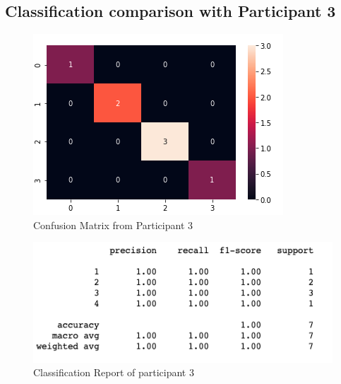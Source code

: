 \pagebreak
\subsection*{Classification comparison with Participant 3 }

\begin{figure}[!htp]
    \includegraphics[width=\textwidth]{Images/p3.png}
    \caption{Confusion Matrix from Participant 3}
    \label{fig:f11}
\end{figure}

\begin{figure}[!htp]
    \includegraphics[width=\textwidth]{Images/p3r.png}
    \caption{Classification Report of participant 3}
    \label{fig:f11}
\end{figure}

\pagebreak

